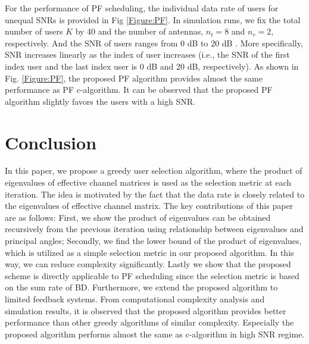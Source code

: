 \documentclass[journal,twoside]{IEEEtranTCOM}
\begin{document}
For the performance of PF scheduling, the individual data rate of users for unequal SNRs is provided in Fig \ref{Figure:PF}. In simulation runs, we fix the total number of users $K$ by 40 and the number of antennas, $n_t=8$ and $n_r=2$, respectively. And the SNR of users ranges from 0 dB to 20 dB \cite{SimulationPF}. More specifically, SNR  increases linearly as the index of user increases (i.e., the SNR of the first index user and the last index user is 0 dB and 20 dB, respectively). As shown in Fig. \ref{Figure:PF}, the proposed PF algorithm provides almost the same performance as PF c-algorithm. It can be observed that the proposed PF algorithm slightly favors the users with a high SNR.


\section{Conclusion} \label{Section:Conclustion}
In this paper, we propose a greedy user selection algorithm, where the product of eigenvalues of effective channel matrices is used as the selection metric at each iteration. The idea is motivated by the fact that the data rate is closely related to the eigenvalues of effective channel matrix. The key contributions of this paper are as follows: First, we show the product of eigenvalues can be obtained recursively from the previous iteration using relationship between eigenvalues and principal angles; Secondly, we find the lower bound of the product of eigenvalues, which is utilized as a simple selection metric in our proposed algorithm. In this way, we can reduce complexity significantly. Lastly we show that  the proposed scheme is directly applicable to PF scheduling since the selection metric is based on the sum rate of BD. Furthermore, we extend the proposed algorithm to limited feedback systems. From computational complexity analysis and simulation results, it is observed  that the proposed algorithm provides better performance than other greedy algorithms of similar complexity. Especially the proposed algorithm performs almost the same as c-algorithm in high SNR regime.





\end{document}
